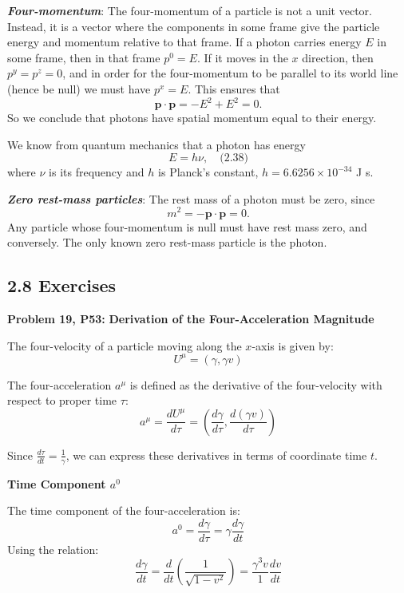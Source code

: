 \documentclass[12pt]{book}
\begin{document}
        \textit{\textbf{Four-momentum}}:
        The four-momentum of a particle is not a unit vector. Instead, it is a vector where the components in some frame give the particle energy and momentum relative to that frame. If a photon carries energy \( E \) in some frame, then in that frame \( p^0 = E \). If it moves in the \( x \) direction, then \( p^y = p^z = 0 \), and in order for the four-momentum to be parallel to its world line (hence be null) we must have \( p^x = E \). This ensures that
        \[
        \mathbf{p} \cdot \mathbf{p} = -E^2 + E^2 = 0.
        \]
        So we conclude that photons have spatial momentum equal to their energy.
        
        We know from quantum mechanics that a photon has energy
        \[
        E = h\nu, \quad \text{(2.38)}
        \]
        where \( \nu \) is its frequency and \( h \) is Planck’s constant, \( h = 6.6256 \times 10^{-34} \) J s.

        \textit{\textbf{Zero rest-mass particles}}:
        The rest mass of a photon must be zero, since
        \[
        m^2 = -\mathbf{p} \cdot \mathbf{p} = 0.
        \]
        Any particle whose four-momentum is null must have rest mass zero, and conversely. The only known zero rest-mass particle is the photon.

        \subsection{2.8 Exercises}
        \textbf{Problem 19, P53:}
            \textbf{Derivation of the Four-Acceleration Magnitude}
            
            The four-velocity of a particle moving along the \( x \)-axis is given by:
            \[
            U^\mu = \left(\gamma, \gamma v\right)
            \]
                    
            The four-acceleration \( a^\mu \) is defined as the derivative of the four-velocity with respect to proper time \( \tau \):
            \[
            a^\mu = \frac{dU^\mu}{d\tau} = \left(\frac{d\gamma}{d\tau}, \frac{d(\gamma v)}{d\tau}\right)
            \]
            
            Since \( \frac{d\tau}{dt} = \frac{1}{\gamma} \), we can express these derivatives in terms of coordinate time \( t \).
            
            \textbf{Time Component \( a^0 \)}
            
            The time component of the four-acceleration is:
            \[
            a^0 = \frac{d\gamma}{d\tau} = \gamma \frac{d\gamma}{dt}
            \]
            Using the relation:
            \[
            \frac{d\gamma}{dt} = \frac{d}{dt} \left(\frac{1}{\sqrt{1 - v^2}}\right) = \frac{\gamma^3 v}{1} \frac{dv}{dt}
            \]
            
\end{document}
